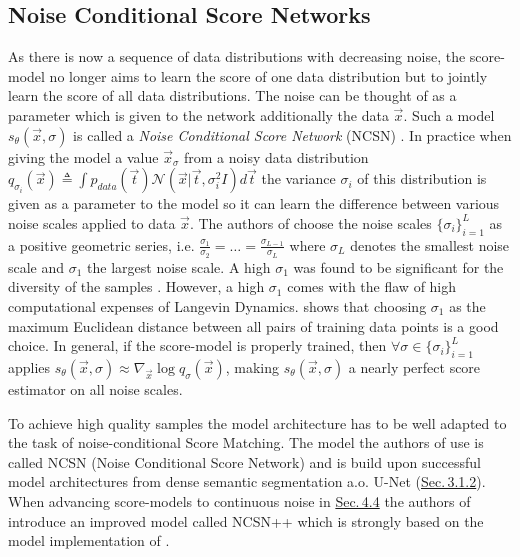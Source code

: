 \subsection{Noise Conditional Score Networks} \label{sec:4.3.1}
As there is now a sequence of data distributions with decreasing noise, the score-model no longer aims to learn the score of one data distribution but to jointly learn the score of all data distributions. The noise can be thought of as a parameter which is given to the network additionally the data $\vec{x}$. Such a model $s_\theta(\vec{x}, \sigma)$ is called a \textit{Noise Conditional Score Network} (NCSN) \cite{score_1}. In practice when giving the model a value $\vec{x}_\sigma$ from a noisy data distribution $q_{\sigma_i}(\vec{x})\triangleq\int p_{data}(\vec{t})\mathcal{N}(\vec{x}|\vec{t},\sigma_i^2I)d\vec{t}$ the variance $\sigma_i$ of this distribution is given as a parameter to the model so it can learn the difference between various noise scales applied to data $\vec{x}$. The authors of \cite{score_1} choose the noise scales $\{\sigma_i\}_{i=1}^L$ as a positive geometric series, i.e. $\frac{\sigma_1}{\sigma_2}=\dots=\frac{\sigma_{L-1}}{\sigma_L}$ where $\sigma_L$ denotes the smallest noise scale and $\sigma_1$ the largest noise scale. A high $\sigma_1$ was found to be significant for the diversity of the samples \cite{score_2}. However, a high $\sigma_1$ comes with the flaw of high computational expenses of Langevin Dynamics. \cite{score_2} shows that choosing $\sigma_1$ as the maximum Euclidean distance between all pairs of training data points is a good choice. In general, if the score-model is properly trained, then $\forall\sigma\in\{\sigma_i\}_{i=1}^L$ applies $s_\theta(\vec{x}, \sigma)\approx\nabla_{\vec{x}}\log q_\sigma(\vec{x})$, making $s_\theta(\vec{x},\sigma)$ a nearly perfect score estimator on all noise scales. 

To achieve high quality samples the model architecture has to be well adapted to the task of noise-conditional Score Matching. The model the authors of \cite{score_1} use is called NCSN (Noise Conditional Score Network) and is build upon successful model architectures from dense semantic segmentation a.o. U-Net (\hyperref[sec:3.1.2]{Sec.\,3.1.2}). When advancing score-models to continuous noise in \hyperref[sec:4.4]{Sec.\,4.4} the authors of \cite{score_3} introduce an improved model called NCSN++ which is strongly based on the model implementation of \cite{ho2020denoising}.

